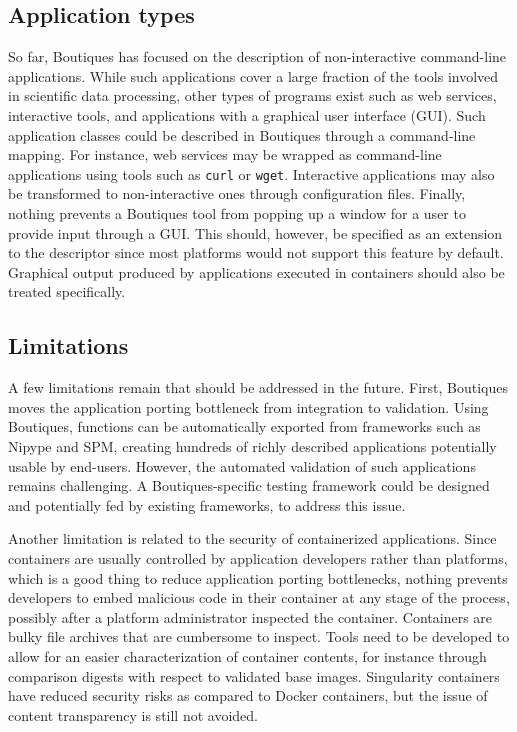 \documentclass[a4paper,num-refs]{oup-contemporary}
\newcommand{\boutiques}{Boutiques\xspace}
\begin{document}
\subsection{Application types}

So far, \boutiques has focused on the description of non-interactive
command-line applications. While such applications cover a large
fraction of the tools involved in scientific data processing, other
types of programs exist such as web services, interactive tools, and
applications with a graphical user interface (GUI).  Such application
classes could be described in \boutiques through a command-line
mapping. For instance, web services may be wrapped as command-line
applications using tools such as \texttt{curl} or
\texttt{wget}. Interactive applications may also be transformed to
non-interactive ones through configuration files. Finally, nothing
prevents a \boutiques tool from popping up a window for a user to
provide input through a GUI. This should, however, be specified
as an extension to the descriptor since most platforms would not support
this feature by default. Graphical output produced by applications
executed in containers should also be treated specifically.

\subsection{Limitations}

A few limitations remain that should be addressed in the
future. First, \boutiques moves the application porting bottleneck
from integration to validation. Using \boutiques, functions can be
automatically exported from frameworks such as Nipype and SPM,
creating hundreds of richly described applications potentially usable
by end-users. However, the automated validation of such applications
remains challenging. A \boutiques-specific testing framework could be
designed and potentially fed by existing frameworks, to address this
issue.

Another limitation is related to the security of containerized
applications. Since containers are usually controlled by application
developers rather than platforms, which is a good thing to reduce
application porting bottlenecks, nothing prevents developers to embed
malicious code in their container at any stage of the process,
possibly after a platform administrator inspected the
container. Containers are bulky file archives that are
cumbersome to inspect. Tools need to be developed to allow for an
easier characterization of container contents, for instance through
comparison digests with respect to validated base images. Singularity
containers have reduced security risks as compared to Docker containers,
but the issue of content transparency is still not avoided.
\end{document}
